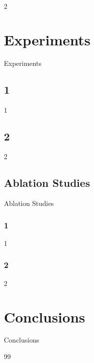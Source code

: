 \documentclass[runningheads]{llncs}
\begin{document}
2









\section{Experiments}

Experiments
\subsection{1}

1








\subsection{2}

2








\subsection{Ablation Studies}


Ablation Studies

\subsubsection{1}

1




\subsubsection{2}

2




\section{Conclusions}

Conclusions







\begin{thebibliography}{99}


\end{thebibliography}
\end{document}
